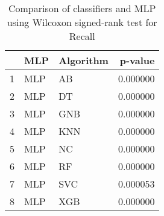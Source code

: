 \begin{table}
\footnotesize
\caption{Comparison of classifiers and MLP using Wilcoxon signed-rank test for Recall}
\label{tab:MLP wilcoxon Recall comparison}
\begin{tabular}{lllr}
\hline
 & MLP & Algorithm & p-value \\
\hline
1 & MLP & AB & 0.000000 \\
2 & MLP & DT & 0.000000 \\
3 & MLP & GNB & 0.000000 \\
4 & MLP & KNN & 0.000000 \\
5 & MLP & NC & 0.000000 \\
6 & MLP & RF & 0.000000 \\
7 & MLP & SVC & 0.000053 \\
8 & MLP & XGB & 0.000000 \\
\hline
\end{tabular}
\end{table}
